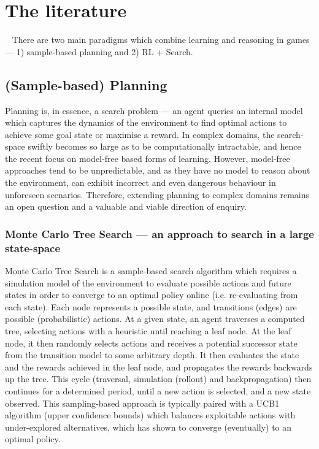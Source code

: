 \section{The literature}~\label{Background}
There are two main paradigms which combine learning and reasoning in games --- 1) sample-based planning and 2) RL + Search. 
\subsection{(Sample-based) Planning}
 Planning is, in essence, a search problem --- an agent queries an internal model which captures the dynamics of the environment to find optimal actions to achieve some goal state or maximise a reward. In complex domains, the search-space swiftly becomes so large as to be computationally intractable, and hence the recent focus on model-free based forms of learning. However, model-free approaches tend to be unpredictable, and as they have no model to reason about the environment, can exhibit incorrect and even dangerous behaviour in unforeseen scenarios. Therefore, extending planning to complex domains remains an open question and a valuable and viable direction of enquiry.  
\subsubsection{Monte Carlo Tree Search --- an approach to search in a large state-space}
Monte Carlo Tree Search is a sample-based search algorithm which requires a simulation model of the environment to evaluate possible actions and future states in order to converge to an optimal policy online (i.e. re-evaluating from each state). 
Each node represents a possible state, and transitions (edges) are possible (probabilistic) actions. At a given state, an agent traverses a computed tree, selecting actions with a heuristic until reaching a leaf node. At the leaf node, it then randomly selects actions and receives a potential successor state from the transition model to some arbitrary depth. It then evaluates the state and the rewards achieved in the leaf node, and propagates the rewards backwards up the tree. This cycle  (traversal, simulation (rollout) and backpropagation) then continues for a determined period, until a new action is selected, and a new state observed. 
\newline \newline
This sampling-based approach is typically paired with a UCB1 algorithm (upper confidence bounds) which balances exploitable actions with under-explored alternatives, which has shown to converge (eventually) to an optimal policy. 


